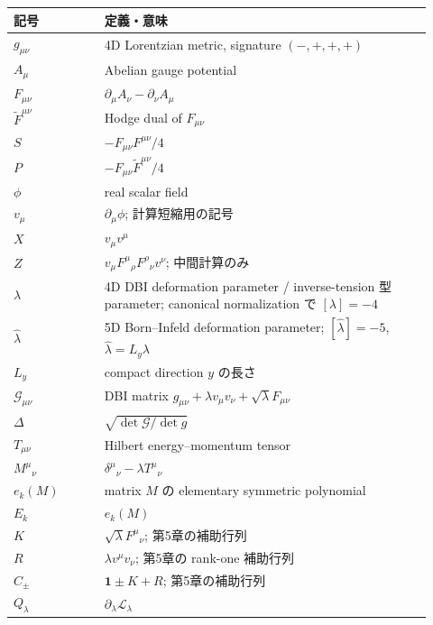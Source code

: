 \documentclass[a4paper,11pt]{ltjsreport}
\newcommand{\Lag}{\mathcal L}
\newcommand{\G}{\mathcal G}
\newcommand{\Id}{\mathbf 1}
\begin{document}
\begin{longtable}{p{0.20\linewidth}p{0.72\linewidth}}
\toprule
記号 & 定義・意味\\
\midrule
$g_{\mu\nu}$ & 4D Lorentzian metric, signature $(-,+,+,+)$\\
$A_\mu$ & Abelian gauge potential\\
$F_{\mu\nu}$ & $\partial_\mu A_\nu-\partial_\nu A_\mu$\\
$\widetilde F^{\mu\nu}$ & Hodge dual of $F_{\mu\nu}$\\
$S$ & $-F_{\mu\nu}F^{\mu\nu}/4$\\
$P$ & $-F_{\mu\nu}\widetilde F^{\mu\nu}/4$\\
$\phi$ & real scalar field\\
$v_\mu$ & $\partial_\mu\phi$; 計算短縮用の記号\\
$X$ & $v_\mu v^\mu$\\
$Z$ & $v_\mu F^\mu{}_{\rho}F^\rho{}_{\nu}v^\nu$; 中間計算のみ\\
$\lambda$ & 4D DBI deformation parameter / inverse-tension 型 parameter; canonical normalization で $[\lambda]=-4$\\
$\widehat\lambda$ & 5D Born--Infeld deformation parameter; $[\widehat\lambda]=-5$, $\widehat\lambda=L_y\lambda$\\
$L_y$ & compact direction $y$ の長さ\\
$\G_{\mu\nu}$ & DBI matrix $g_{\mu\nu}+\lambda v_\mu v_\nu+\sqrt\lambda F_{\mu\nu}$\\
$\Delta$ & $\sqrt{\det\G/\det g}$\\
$T_{\mu\nu}$ & Hilbert energy--momentum tensor\\
$M^\mu{}_{\nu}$ & $\delta^\mu{}_{\nu}-\lambda T^\mu{}_{\nu}$\\
$e_k(M)$ & matrix $M$ の elementary symmetric polynomial\\
$E_k$ & $e_k(M)$\\
$K$ & $\sqrt\lambda F^\mu{}_{\nu}$; 第5章の補助行列\\
$R$ & $\lambda v^\mu v_\nu$; 第5章の rank-one 補助行列\\
$C_\pm$ & $\Id\pm K+R$; 第5章の補助行列\\
$Q_\lambda$ & $\partial_\lambda\Lag_\lambda$\\
\bottomrule
\end{longtable}
\end{document}
